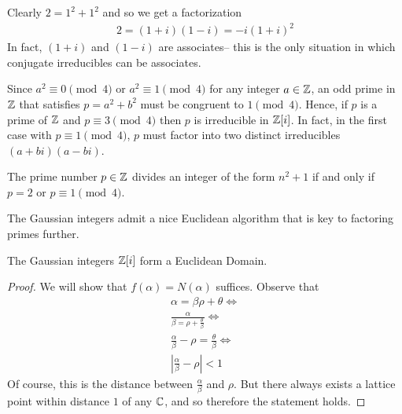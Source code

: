 \documentclass{memoir}
\begin{document}
\begin{exmp}
	Clearly \(2 = 1^2+1^2\) and so we get a factorization
	\begin{align*}
		2 = (1+i)(1-i) = -i(1+i)^2
	\end{align*}
	In fact, \((1+i)\) and \((1-i)\) are associates-- this is the only situation in which conjugate irreducibles can be associates.
\end{exmp}
Since \(a^2 \equiv 0 \pmod{4}\) or \(a^2 \equiv 1\pmod{4}\) for any integer \(a \in \mathbb{Z}\), an odd prime in \(\mathbb{Z}\) that satisfies \(p = a^2+b^2\) must be congruent to \(1 \pmod{ 4}\). Hence, if \(p\) is a prime of \(\mathbb{Z}\) and \(p \equiv 3 \pmod{4}\) then \(p\) is irreducible in \(\mathbb{Z}[i]\). In fact, in the first case with \(p \equiv 1 \pmod{4}\), \(p\) must factor into two distinct irreducibles \((a+bi)(a-bi)\).

\begin{lemma}
	The prime number \(p \in \mathbb{Z}\) divides an integer of the form \(n^2+1\) if and only if \(p = 2\) or \(p \equiv 1 \pmod{ 4}\).
\end{lemma}

The Gaussian integers admit a nice Euclidean algorithm that is key to factoring primes further.
\begin{thm}
	The Gaussian integers \(\mathbb{Z}[i]\) form a Euclidean Domain.
\end{thm}
\begin{proof}%
	We will show that \(f(\alpha) = N(\alpha)\) suffices. Observe that
	\begin{align*}
		\alpha = \beta \rho + \theta \iff\\
		\frac{\alpha}{\beta = \rho + \frac{\theta}{\beta}}\iff\\
		\frac{\alpha}{\beta}-\rho = \frac{\theta}{\beta} \iff\\
		\left| \frac{\alpha}{\beta} - \rho \right| < 1
	\end{align*}
	Of course, this is the distance between \(\frac{\alpha}{\beta}\) and \(\rho\). But there always exists a lattice point within distance \(1\) of any \(\mathbb{C}\), and so therefore the statement holds.
\end{proof}
\end{document}
